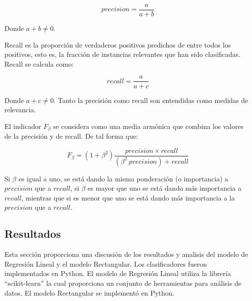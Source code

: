 \documentclass[conference]{IEEEtran}
\begin{document}
\begin{equation} \label{equation:Especificidad}
	precision = \frac{a}{a + b}
\end{equation}

Donde $a + b \neq 0$. \newline

Recall es la proporción de verdaderos positivos predichos de entre todos los
positivos, esto es, la fracción de instancias relevantes que han sido clasificadas. Recall se calcula como:

\begin{equation} \label{equation:Especificidad}
	recall = \frac{a}{a + c}
\end{equation}

Donde $a + c \neq 0$. Tanto la precisión como recall son entendidas como medidas de relevancia. \newline

El indicador $F_{\beta}$ se considera como una media armónica que combina los valores de la precisión y de recall. De tal forma que:

\begin{equation} \label{equation:Especificidad}
	F_{\beta} = (1 + \beta^{2}) \frac{precision \times recall}{(\beta^{2}~precision) + recall}
\end{equation}

Si $\beta$ es igual a uno, se está dando la misma ponderación (o importancia) a $precision$ que a $recall$, si $\beta$ es mayor que uno se está dando más importancia a $recall$, mientras que si es menor que uno se está dando más importancia a la $precision$ que a $recall$. \newline


\subsection{Resultados}
Esta sección proporciona una discusión de los resultados y analisis del modelo de Regresión Lineal y el modelo Rectangular. Los clasificadores fueron implementados en Python. El modelo de Regresión Lineal utiliza la librería ``scikit-learn'' la cual proporciona un conjunto de herramientas para análisis de datos. El modelo Rectangular se implementó en Python. \newline
\end{document}

